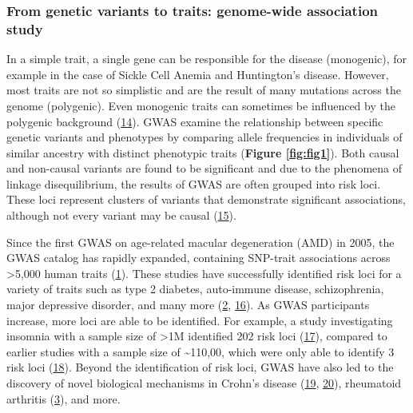 \hypertarget{from-genetic-variants-to-traits-genome-wide-association-study}{%
\subsubsection{From genetic variants to traits: genome-wide association study}\label{from-genetic-variants-to-traits-genome-wide-association-study}}

In a simple trait, a single gene can be responsible for the disease (monogenic), for example in the case of Sickle Cell Anemia and Huntington's disease.
However, most traits are not so simplistic and are the result of many mutations across the genome (polygenic).
Even monogenic traits can sometimes be influenced by the polygenic background (\protect\hyperlink{ref-VqGYQMXO}{14}).
GWAS examine the relationship between specific genetic variants and phenotypes by comparing allele frequencies in individuals of similar ancestry with distinct phenotypic traits (\textbf{Figure \ref{fig:fig1}}).
Both causal and non-causal variants are found to be significant and due to the phenomena of linkage disequilibrium, the results of GWAS are often grouped into risk loci.
These loci represent clusters of variants that demonstrate significant associations, although not every variant may be causal (\protect\hyperlink{ref-1873zCaaX}{15}).

Since the first GWAS on age-related macular degeneration (AMD) in 2005, the GWAS catalog has rapidly expanded, containing SNP-trait associations across \textgreater5,000 human traits (\protect\hyperlink{ref-VRCjjZ9L}{1}).
These studies have successfully identified risk loci for a variety of traits such as type 2 diabetes, auto-immune disease, schizophrenia, major depressive disorder, and many more (\protect\hyperlink{ref-17B4AigZT}{2}, \protect\hyperlink{ref-yqBcaXHD}{16}).
As GWAS participants increase, more loci are able to be identified.
For example, a study investigating insomnia with a sample size of \textgreater1M identified 202 risk loci (\protect\hyperlink{ref-sBTrhvlJ}{17}), compared to earlier studies with a sample size of \textasciitilde110,00, which were only able to identify 3 risk loci (\protect\hyperlink{ref-crCAymA1}{18}).
Beyond the identification of risk loci, GWAS have also led to the discovery of novel biological mechanisms in Crohn's disease (\protect\hyperlink{ref-s6z5ZuY3}{19}, \protect\hyperlink{ref-gxwza7fO}{20}), rheumatoid arthritis (\protect\hyperlink{ref-HicyXvA4}{3}), and more.

